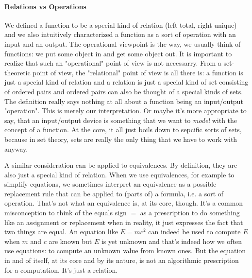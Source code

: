 \paragraph{Relations vs Operations}
We defined a function to be a special kind of relation (left-total, right-unique) and we also intuitively characterized a function as a sort of operation with an input and an output. The operational viewpoint is the way, we usually think of functions: we put some object in and get some object out. It is important to realize that such an "operational" point of view is not necessarry. From a set-theoretic point of view, the "relational" point of view is all there is: a function is just a special kind of relation and a relation is just a special kind of set consisting of ordered pairs and ordered pairs can also be thought of a special kinds of sets. The definition really says nothing at all about a function being an input/output "operation". This is merely our interpretation. Or maybe it's more appropriate to say, that an input/output device is something that we want to \emph{model} with the concept of a function. At the core, it all just boils down to sepcific sorts of sets, because in set theory, sets are really the only thing that we have to work with anyway.

\medskip

A similar consideration can be applied to equivalences. By definition, they are also just a special kind of relation. When we use equivalences, for example to simplify equations, we sometimes interpret an equivalence as a possible replacement rule that can be applied to (parts of) a formula, i.e. a sort of operation. That's not what an equivalence is, at its core, though. It's a common misconception to think of the equals sign $=$ as a prescription to do something like an assignment or replacement when in reality, it just expresses the fact that two things are equal. An equation like $E = m c^2$ can indeed be used to compute $E$ when $m$ and $c$ are known but $E$ is yet unknown and that's indeed how we often use equations: to compute an unknown value from known ones. But the equation in and of itself, at its core and by its nature, is not an algorithmic prescription for a computation. It's just a relation.




